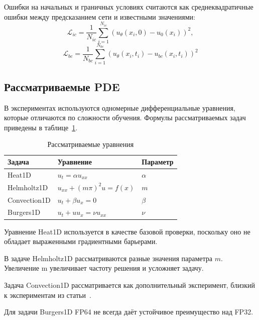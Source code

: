 \documentclass[14pt,a4paper]{extarticle}
\begin{document}
Ошибки на начальных и граничных условиях считаются как среднеквадратичные ошибки между предсказанием сети и известными значениями:
\begin{equation}
    \mathcal{L}_{ic}
    =
    \frac{1}{N_{ic}}
    \sum_{i=1}^{N_{ic}}
    \left(
        u_\theta(x_i,0) - u_0(x_i)
    \right)^2,
    \label{eq:ic_loss}
\end{equation}
\begin{equation}
    \mathcal{L}_{bc}
    =
    \frac{1}{N_{bc}}
    \sum_{i=1}^{N_{bc}}
    \left(
        u_\theta(x_i,t_i) - u_{bc}(x_i,t_i)
    \right)^2
    \label{eq:bc_loss}
\end{equation}


\subsection{Рассматриваемые PDE}

В экспериментах используются одномерные дифференциальные уравнения, которые отличаются по сложности обучения. Формулы рассматриваемых задач приведены в таблице~\ref{tab:pde_equations}.

\begin{table}[H]
\centering
\caption{Рассматриваемые уравнения}
\label{tab:pde_equations}
\begin{tabular}{lll}
\hline
Задача & Уравнение & Параметр \\
\hline
Heat1D &
$u_t = \alpha u_{xx}$ &
$\alpha$ \\

Helmholtz1D &
$u_{xx} + (m\pi)^2 u = f(x)$ &
$m$ \\

Convection1D &
$u_t + \beta u_x = 0$ &
$\beta$ \\

Burgers1D &
$u_t + u u_x = \nu u_{xx}$ &
$\nu$ \\
\hline
\end{tabular}
\end{table}

Уравнение Heat1D используется в качестве базовой проверки, поскольку оно не обладает выраженными градиентными барьерами.

В задаче Helmholtz1D рассматриваются разные значения параметра $m$. Увеличение m увеличивает частоту решения и усложняет задачу.

Задача Convection1D рассматривается как дополнительный эксперимент, близкий к экспериментам из статьи~\cite{wang2025fp64}.

 Для задачи Burgers1D FP64 не всегда даёт устойчивое преимущество над FP32.
\end{document}
